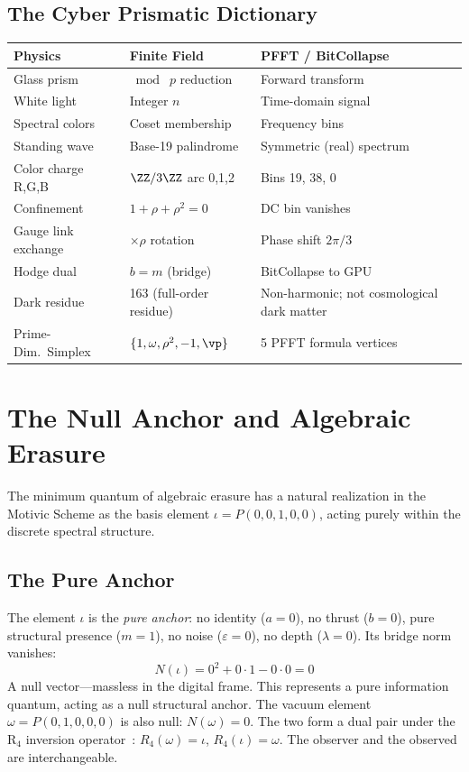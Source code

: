 \subsection{The Cyber Prismatic Dictionary}

\begin{center}
\begin{tabular}{@{}lll@{}}
\toprule
\textbf{Physics} & \textbf{Finite Field} & \textbf{PFFT / BitCollapse} \\
\midrule
Glass prism & $\bmod\; p$ reduction & Forward transform \\
White light & Integer $n$ & Time-domain signal \\
Spectral colors & Coset membership & Frequency bins \\
Standing wave & Base-19 palindrome & Symmetric (real) spectrum \\
Color charge R,G,B & $\ZZ/3\ZZ$ arc 0,1,2 & Bins 19, 38, 0 \\
Confinement & $1 + \rho + \rho^2 = 0$ & DC bin vanishes \\
Gauge link exchange & $\times\rho$ rotation & Phase shift $2\pi/3$ \\
Hodge dual & $b = m$ (bridge) & BitCollapse to GPU \\
Dark residue & 163 (full-order residue) & Non-harmonic; not cosmological dark matter \\
Prime-Dim.\ Simplex & $\{1, \omega, \rho^2, -1, \vp\}$ & 5 PFFT formula vertices \\
\bottomrule
\end{tabular}
\end{center}


\section{The Null Anchor and Algebraic Erasure}

The minimum quantum of algebraic erasure has a natural realization in the Motivic Scheme as the basis element $\iota = P(0, 0, 1, 0, 0)$, acting purely within the discrete spectral structure.

\subsection{The Pure Anchor}

The element $\iota$ is the \emph{pure anchor}: no identity ($a = 0$), no thrust ($b = 0$), pure structural presence ($m = 1$), no noise ($\varepsilon = 0$), no depth ($\lambda = 0$). Its bridge norm vanishes:
\[
N(\iota) = 0^2 + 0 \cdot 1 - 0 \cdot 0 = 0
\]
A null vector---massless in the digital frame. This represents a pure information quantum, acting as a null structural anchor. The vacuum element $\omega = P(0, 1, 0, 0, 0)$ is also null: $N(\omega) = 0$. The two form a dual pair under the R$_4$ inversion operator~\cite{larue_lc}: $R_4(\omega) = \iota$, $R_4(\iota) = \omega$. The observer and the observed are interchangeable.

